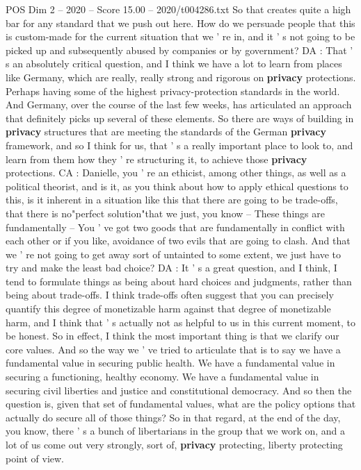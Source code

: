 \begin{textsample}{POS Dim 2 – 2020 – Score 15.00 – 2020/t004286.txt}
So that creates quite a high bar for any standard that we push out here.
How do we persuade people that this is custom-made for the current situation that we ' re in, and it ' s not going to be picked up and subsequently abused by companies or by government?
DA : That ' s an absolutely critical question, and I think we have a lot to learn from places like Germany, which are really, really strong and rigorous on \textbf{privacy} protections.
Perhaps having some of the highest privacy-protection standards in the world.
And Germany, over the course of the last few weeks, has articulated an approach that definitely picks up several of these elements.
So there are ways of building in \textbf{privacy} structures that are meeting the standards of the German \textbf{privacy} framework, and so I think for us, that ' s a really important place to look to, and learn from them how they ' re structuring it, to achieve those \textbf{privacy} protections.
CA : Danielle, you ' re an ethicist, among other things, as well as a political theorist, and is it, as you think about how to apply ethical questions to this, is it inherent in a situation like this that there are going to be trade-offs, that there is no"perfect solution"that we just, you know -- These things are fundamentally -- You ' ve got two goods that are fundamentally in conflict with each other or if you like, avoidance of two evils that are going to clash.
And that we ' re not going to get away sort of untainted to some extent, we just have to try and make the least bad choice?
DA : It ' s a great question, and I think, I tend to formulate things as being about hard choices and judgments, rather than being about trade-offs.
I think trade-offs often suggest that you can precisely quantify this degree of monetizable harm against that degree of monetizable harm, and I think that ' s actually not as helpful to us in this current moment, to be honest.
So in effect, I think the most important thing is that we clarify our core values.
And so the way we ' ve tried to articulate that is to say we have a fundamental value in securing public health.
We have a fundamental value in securing a functioning, healthy economy.
We have a fundamental value in securing civil liberties and justice and constitutional democracy.
And so then the question is, given that set of fundamental values, what are the policy options that actually do secure all of those things?
So in that regard, at the end of the day, you know, there ' s a bunch of libertarians in the group that we work on, and a lot of us come out very strongly, sort of, \textbf{privacy} protecting, liberty protecting point of view.

\end{textsample}
